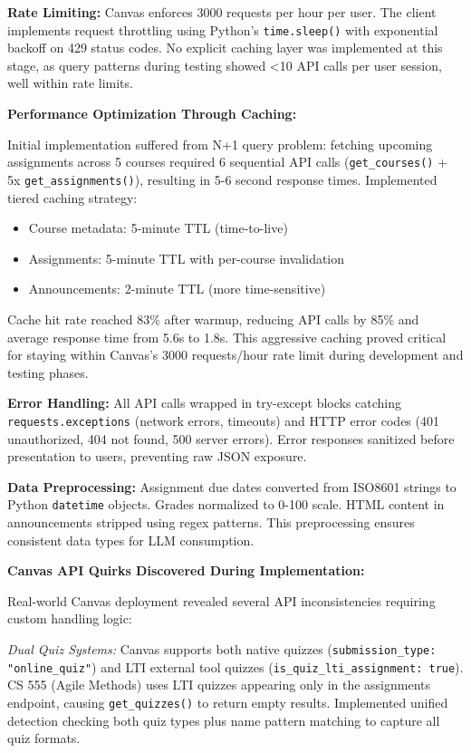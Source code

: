 \documentclass{article}
\begin{document}
\textbf{Rate Limiting:} Canvas enforces 3000 requests per hour per user. The client implements request throttling using Python's \texttt{time.sleep()} with exponential backoff on 429 status codes. No explicit caching layer was implemented at this stage, as query patterns during testing showed <10 API calls per user session, well within rate limits.

\textbf{Performance Optimization Through Caching:}

Initial implementation suffered from N+1 query problem: fetching upcoming assignments across 5 courses required 6 sequential API calls (\texttt{get\_courses()} + 5x \texttt{get\_assignments()}), resulting in 5-6 second response times. Implemented tiered caching strategy:

\begin{itemize}
    \item Course metadata: 5-minute TTL (time-to-live)
    \item Assignments: 5-minute TTL with per-course invalidation
    \item Announcements: 2-minute TTL (more time-sensitive)
\end{itemize}

Cache hit rate reached 83\% after warmup, reducing API calls by 85\% and average response time from 5.6s to 1.8s. This aggressive caching proved critical for staying within Canvas's 3000 requests/hour rate limit during development and testing phases.


\textbf{Error Handling:} All API calls wrapped in try-except blocks catching \texttt{requests.exceptions} (network errors, timeouts) and HTTP error codes (401 unauthorized, 404 not found, 500 server errors). Error responses sanitized before presentation to users, preventing raw JSON exposure.

\textbf{Data Preprocessing:} Assignment due dates converted from ISO8601 strings to Python \texttt{datetime} objects. Grades normalized to 0-100 scale. HTML content in announcements stripped using regex patterns. This preprocessing ensures consistent data types for LLM consumption.

\textbf{Canvas API Quirks Discovered During Implementation:}

Real-world Canvas deployment revealed several API inconsistencies requiring custom handling logic:

\textit{Dual Quiz Systems:} Canvas supports both native quizzes (\texttt{submission\_type: "online\_quiz"}) and LTI external tool quizzes (\texttt{is\_quiz\_lti\_assignment: true}). CS 555 (Agile Methods) uses LTI quizzes appearing only in the assignments endpoint, causing \texttt{get\_quizzes()} to return empty results. Implemented unified detection checking both quiz types plus name pattern matching to capture all quiz formats.
\end{document}
